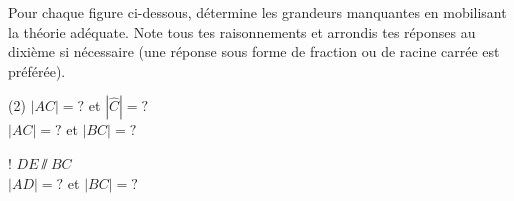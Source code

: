 %
%
    Pour chaque figure ci-dessous, détermine les grandeurs manquantes en mobilisant la théorie adéquate. Note tous tes raisonnements et arrondis tes réponses au dixième si nécessaire (une réponse sous forme de fraction ou de racine carrée est préférée).

    \begin{tasks}[after-item-skip=2cm](2)
        \task
        $|AC| = ?$ et $|\widehat{C}|=?$\\

        \task
        $|AC|=?$ et $|BC|=?$
        \begin{center}
            
        \end{center}

        \task!
        $DE \sslash BC$\\$|AD|=?$ et $|BC|=?$
        \begin{center}
            
        \end{center}

    \end{tasks}
